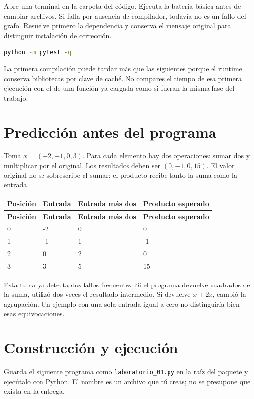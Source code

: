 \documentclass[12pt,a4paper,oneside]{report}
\begin{document}
Abre una terminal en la carpeta del código. Ejecuta la batería básica antes de cambiar archivos. Si falla por ausencia de compilador, todavía no es un fallo del grafo. Resuelve primero la dependencia y conserva el mensaje original para distinguir instalación de corrección.

\begin{lstlisting}[language=bash]
python -m pytest -q
\end{lstlisting}
La primera compilación puede tardar más que las siguientes porque el runtime conserva bibliotecas por clave de caché. No compares el tiempo de esa primera ejecución con el de una función ya cargada como si fueran la misma fase del trabajo.

\section{Predicción antes del programa}
Toma $x=(-2,-1,0,3)$. Para cada elemento hay dos operaciones: sumar dos y multiplicar por el original. Los resultados deben ser $(0,-1,0,15)$. El valor original no se sobrescribe al sumar: el producto recibe tanto la suma como la entrada.

{\small
\begin{longtable}{@{}P{0.22\textwidth}P{0.23\textwidth}P{0.23\textwidth}P{0.23\textwidth}@{}}
\toprule
\textbf{Posición} & \textbf{Entrada} & \textbf{Entrada más dos} & \textbf{Producto esperado}\\
\midrule
\endfirsthead
\toprule
\textbf{Posición} & \textbf{Entrada} & \textbf{Entrada más dos} & \textbf{Producto esperado}\\
\midrule
{} & -2 & 0 & 0\\
1 & -1 & 1 & -1\\
2 & 0 & 2 & 0\\
3 & 3 & 5 & 15\\
\bottomrule
\end{longtable}
}
Esta tabla ya detecta dos fallos frecuentes. Si el programa devuelve cuadrados de la suma, utilizó dos veces el resultado intermedio. Si devuelve $x+2x$, cambió la agrupación. Un ejemplo con una sola entrada igual a cero no distinguiría bien esas equivocaciones.

\section{Construcción y ejecución}
Guarda el siguiente programa como \texttt{laboratorio\_01.py} en la raíz del paquete y ejecútalo con Python. El nombre es un archivo que tú creas; no se presupone que exista en la entrega.
\end{document}
